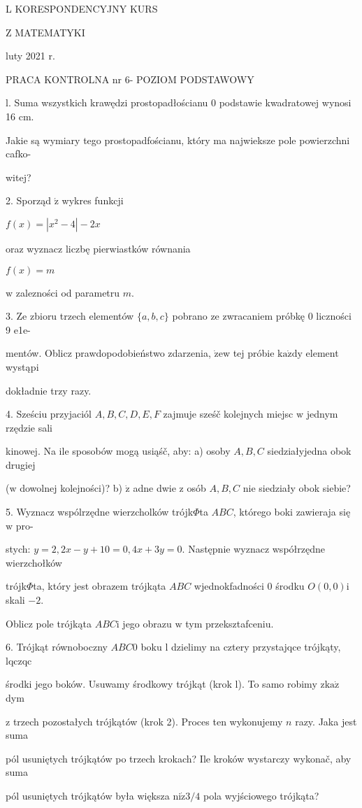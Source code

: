 \documentclass[a4paper,12pt]{article}
\begin{document}
L KORESPONDENCYJNY KURS

Z MATEMATYKI

luty 2021 r.

PRACA KONTROLNA nr 6- POZIOM PODSTAWOWY

l. Suma wszystkich krawędzi prostopadłościanu $0$ podstawie kwadratowej wynosi 16 cm.

Jakie są wymiary tego prostopadfościanu, który ma najwieksze pole powierzchni cafko-

witej?

2. Sporząd $\acute{\mathrm{z}}$ wykres funkcji

$f(x)=|x^{2}-4|-2x$

oraz wyznacz liczbę pierwiastków równania

$f(x)=m$

$\mathrm{w}$ zalezności od parametru $m.$

3. Ze zbioru trzech elementów $\{a,b,c\}$ pobrano ze zwracaniem próbkę $0$ liczności 9 e1e-

mentów. Oblicz prawdopodobieństwo zdarzenia, $\dot{\mathrm{z}}\mathrm{e}\mathrm{w}$ tej próbie $\mathrm{k}\mathrm{a}\dot{\mathrm{z}}\mathrm{d}\mathrm{y}$ element wystąpi

dokładnie trzy razy.

4. Sześciu przyjaciól $A, B, C, D, E, F$ zajmuje sześč kolejnych miejsc $\mathrm{w}$ jednym rzędzie sali

kinowej. Na ile sposobów mogą usiąśč, aby: a) osoby $A, B, C$ siedziałyjedna obok drugiej

($\mathrm{w}$ dowolnej kolejności)? b) $\dot{\mathrm{z}}$ adne dwie $\mathrm{z}$ osób $A, B, C$ nie siedziały obok siebie?

5. Wyznacz wspólrzędne wierzcholków trójk$\Phi$ta $ABC$, którego boki zawieraja się $\mathrm{w}$ pro-

stych: $y=2, 2x-y+10=0, 4x+3y=0$. Następnie wyznacz współrzędne wierzchołków

trójk$\Phi$ta, który jest obrazem trójkąta $ABC$ wjednokfadności $0$ środku $O(0,0)\mathrm{i}$ skali $-2.$

Oblicz pole trójkąta $ABC\mathrm{i}$ jego obrazu $\mathrm{w}$ tym przeksztafceniu.

6. Trójkąt równoboczny $ABC 0$ boku l dzielimy na cztery przystajqce trójkąty, lqczqc

środki jego boków. Usuwamy środkowy trójkąt (krok l). To samo robimy $\mathrm{z} \mathrm{k}\mathrm{a}\dot{\mathrm{z}}$ dym

$\mathrm{z}$ trzech pozostałych trójkątów (krok 2). Proces ten wykonujemy $n$ razy. Jaka jest suma

pól usuniętych trójkątów po trzech krokach? Ile kroków wystarczy wykonač, aby suma

pól usuniętych trójkątów była większa $\mathrm{n}\mathrm{i}\dot{\mathrm{z}}3/4$ pola wyjściowego trójkąta?
\end{document}

